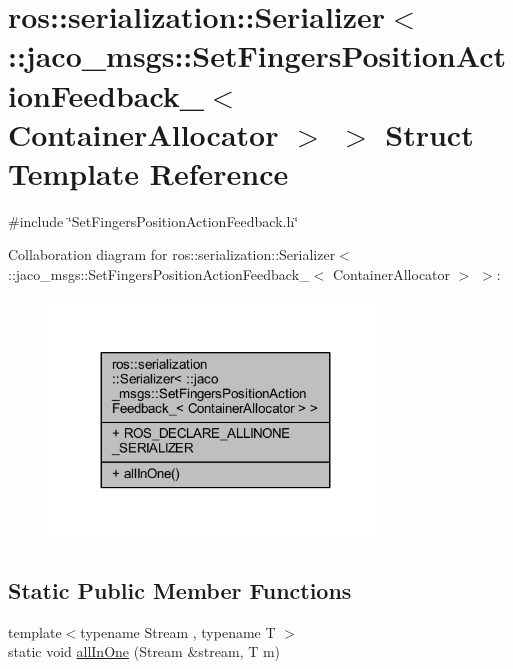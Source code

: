 \hypertarget{structros_1_1serialization_1_1Serializer_3_01_1_1jaco__msgs_1_1SetFingersPositionActionFeedback_447d288d4cb72b1c92e396d90d0558f7}{}\section{ros\+:\+:serialization\+:\+:Serializer$<$ \+:\+:jaco\+\_\+msgs\+:\+:Set\+Fingers\+Position\+Action\+Feedback\+\_\+$<$ Container\+Allocator $>$ $>$ Struct Template Reference}
\label{structros_1_1serialization_1_1Serializer_3_01_1_1jaco__msgs_1_1SetFingersPositionActionFeedback_447d288d4cb72b1c92e396d90d0558f7}


{\ttfamily \#include \char`\"{}Set\+Fingers\+Position\+Action\+Feedback.\+h\char`\"{}}



Collaboration diagram for ros\+:\+:serialization\+:\+:Serializer$<$ \+:\+:jaco\+\_\+msgs\+:\+:Set\+Fingers\+Position\+Action\+Feedback\+\_\+$<$ Container\+Allocator $>$ $>$\+:
\nopagebreak
\begin{figure}[H]
\begin{center}
\leavevmode
\includegraphics[width=251pt]{d1/df8/structros_1_1serialization_1_1Serializer_3_01_1_1jaco__msgs_1_1SetFingersPositionActionFeedback_e68c1fc80ffb172c5df845bf8c2fd2f7}
\end{center}
\end{figure}
\subsection*{Static Public Member Functions}
\begin{DoxyCompactItemize}
\item 
{\footnotesize template$<$typename Stream , typename T $>$ }\\static void \hyperlink{structros_1_1serialization_1_1Serializer_3_01_1_1jaco__msgs_1_1SetFingersPositionActionFeedback_447d288d4cb72b1c92e396d90d0558f7_a6805ec5226f38ed18dd4a084d7527c62}{all\+In\+One} (Stream \&stream, T m)
\end{DoxyCompactItemize}
